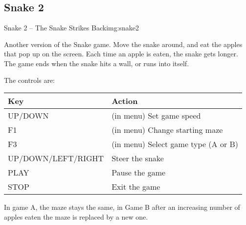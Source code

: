 \subsection{Snake 2}
%
{Snake 2 {--} The Snake Strikes Back}{img:snake2}

Another version of the Snake game. Move the snake around, and eat the
apples that pop up on the screen. Each time an apple is eaten, the
snake gets longer. The game ends when the snake hits a wall, or runs
into itself. 

The controls are:

\begin{table}[h!]
\begin{center}
\begin{tabular}{@{}ll@{}}\toprule
\textbf{Key} & \textbf{Action} \\\midrule
UP/DOWN & (in menu) Set game speed \\
F1 & (in menu) Change starting maze \\
F3 & (in menu) Select game type (A or B) \\
UP/DOWN/LEFT/RIGHT & Steer the snake \\
PLAY & Pause the game \\
STOP & Exit the game \\\bottomrule
\end{tabular}
\end{center}
\end{table}
In game A, the maze stays the same, in Game B
after an increasing number of apples eaten the maze is replaced by a
new one.

